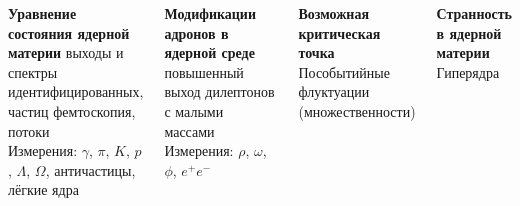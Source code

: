 \documentclass[dvipsnames] {beamer}
\begin{document}
\begin{frame}
{\begin{columns}[t]
                 \begin{block}{\bf \centering \footnotesize Уравнение состояния ядерной материи}
                   \centering
                       {\color{ForestGreen} выходы и спектры идентифицированных, частиц фемтоскопия, потоки} \\
                       {\color {Red} Измерения: $\gamma$, $\pi$, $K$, $p$, $\Lambda$, $\Omega$, античастицы, лёгкие ядра}
                 \end{block}
                 \vskip -0.3cm
                 \begin{block}{\bf \centering \footnotesize Модификации адронов в ядерной среде}
                   \centering 
                       {\color{ForestGreen} повышенный выход дилептонов с малыми массами} \\
                       {\color{Red} Измерения: $\rho$, $\omega$, $\phi$, $e^{+}e^{-}$}
                 \end{block}
                 \vskip -0.3cm
                 \begin{block}{\bf \centering \footnotesize Возможная критическая точка}
                   \centering 
                       {\color{ForestGreen} Пособытийные флуктуации (множественности)}
                 \end{block}
                 \vskip -0.3cm
                 \begin{block}{\bf \centering \footnotesize Странность в ядерной материи}
                   \centering 
                       {\color{ForestGreen} Гиперядра}
                 \end{block}
               \end{columns}
             }
\end{frame}
\end{document}
